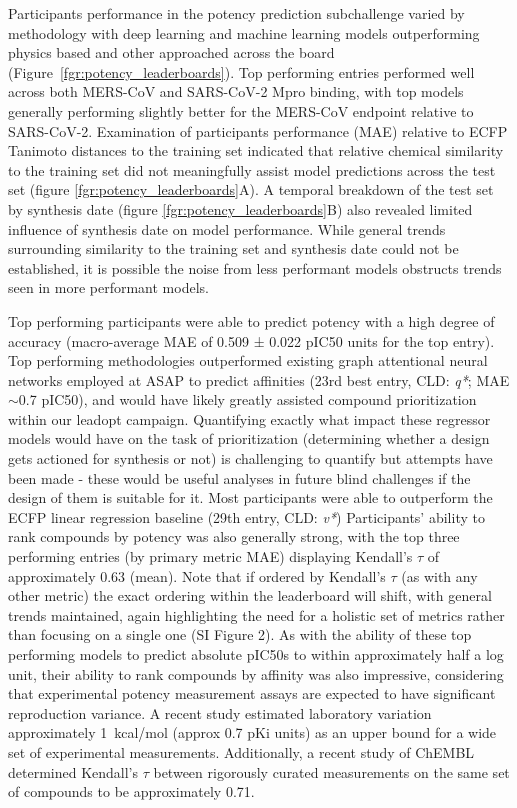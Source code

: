 \documentclass[journal=jcim,manuscript=article]{achemso}
\begin{document}
Participants performance in the potency prediction subchallenge varied by methodology with deep learning and machine learning models outperforming physics based and other approached across the board (Figure~\ref{fgr:potency_leaderboards}). Top performing entries performed well across both MERS-CoV and SARS-CoV-2 Mpro binding, with top models generally performing slightly better for the MERS-CoV endpoint relative to SARS-CoV-2. Examination of participants performance (MAE) relative to ECFP Tanimoto distances to the training set indicated that relative chemical similarity to the training set did not meaningfully assist model predictions across the test set (figure \ref{fgr:potency_leaderboards}A). A temporal breakdown of the test set by synthesis date (figure \ref{fgr:potency_leaderboards}B) also revealed limited influence of synthesis date on model performance. While general trends surrounding similarity to the training set and synthesis date could not be established, it is possible the noise from less performant models obstructs trends seen in more performant models.


Top performing participants were able to predict potency with a high degree of accuracy (macro-average MAE of 0.509 ± 0.022 pIC50 units for the top entry). Top performing methodologies outperformed existing graph attentional neural networks employed at ASAP to predict affinities (23rd best entry, CLD: \textit{q*}; MAE$\sim$0.7 pIC50), and would have likely greatly assisted compound prioritization within our leadopt campaign. Quantifying exactly what impact these regressor models would have on the task of prioritization (determining whether a design gets actioned for synthesis or not) is challenging to quantify but attempts have been made - these would be useful analyses in future blind challenges if the design of them is suitable for it.\cite{ash_practically_2024} Most participants were able to outperform the ECFP linear regression baseline (29th entry, CLD: \textit{v*}) Participants' ability to rank compounds by potency was also generally strong, with the top three performing entries (by primary metric MAE) displaying Kendall's $\tau$ of approximately 0.63 (mean). Note that if ordered by Kendall's $\tau$ (as with any other metric) the exact ordering within the leaderboard will shift, with general trends maintained, again highlighting the need for a holistic set of metrics rather than focusing on a single one (SI Figure 2). As with the ability of these top performing models to predict absolute pIC50s to within approximately half a log unit, their ability to rank compounds by affinity was also impressive, considering that experimental potency measurement assays are expected to have significant reproduction variance. A recent study estimated laboratory variation approximately 1~kcal/mol (approx 0.7 pKi units) as an upper bound\cite{ross_maximal_2023} for a wide set of experimental measurements. Additionally, a recent study of ChEMBL\cite{landrum_combining_2024} determined Kendall's $\tau$ between rigorously curated measurements on the same set of compounds to be approximately 0.71.
\end{document}
